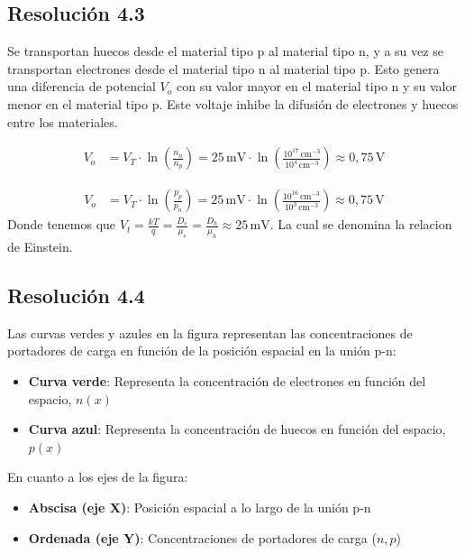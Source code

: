 \documentclass[
  11pt,
  letterpaper,
   addpoints,
  ]{exam}
\begin{document}
\begin{questions}
\begin{solution}
    \subsection*{Resolución 4.3}
    
    Se transportan huecos desde el material tipo p al material tipo n, y a su vez se transportan electrones desde el material tipo n al material tipo p. Esto genera una diferencia de potencial $V_o$ con su valor mayor en el material tipo n y su valor menor en el material tipo p. Este voltaje inhibe la difusión de electrones y huecos entre los materiales.

    \begin{align}
        V_o &= V_T \cdot \ln\left(\frac{n_n}{n_p}\right) = 25\,\text{mV} \cdot \ln\left(\frac{10^{17}\,\text{cm}^{-3}}{10^4\,\text{cm}^{-3}}\right) \approx 0{,}75\,\text{V}
    \end{align}

    \begin{align}
        V_o &= V_T \cdot \ln\left(\frac{p_p}{p_n}\right) = 25\,\text{mV} \cdot \ln\left(\frac{10^{16}\,\text{cm}^{-3}}{10^3\,\text{cm}^{-3}}\right) \approx 0{,}75\,\text{V}
    \end{align}
Donde tenemos que $V_{t} = \frac{kT}{q} = \frac{D_{e}}{\mu_{e}} = \frac{D_{h}}{\mu_{h}} \approx 25\,\text{mV}$. La cual se denomina la relacion de Einstein.
    \subsection*{Resolución 4.4}
    
    Las curvas verdes y azules en la figura representan las concentraciones de portadores de carga en función de la posición espacial en la unión p-n:

    \begin{itemize}
        \item \textbf{Curva verde}: Representa la concentración de electrones en función del espacio, $n(x)$
        \item \textbf{Curva azul}: Representa la concentración de huecos en función del espacio, $p(x)$
    \end{itemize}

    En cuanto a los ejes de la figura:
    \begin{itemize}
        \item \textbf{Abscisa (eje X)}: Posición espacial a lo largo de la unión p-n
        \item \textbf{Ordenada (eje Y)}: Concentraciones de portadores de carga ($n, p$)
    \end{itemize}


\end{solution}
\end{questions}
\end{document}
